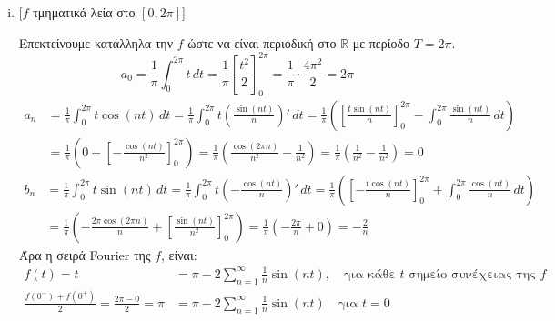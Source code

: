 \documentclass[a4paper,table]{report}
\begin{document}
\begin{solution}
\item {}
  \begin{enumerate}[i)]
    \item 
      \begin{minipage}[t]{0.53\textwidth}
        [$f$ τμηματικά λεία στο $ [0,2 \pi] $]
      \end{minipage}

      Επεκτείνουμε κατάλληλα την $f$ ώστε να είναι περιοδική στο $\mathbb{R}$ 
      με περίοδο $ T=2 \pi $.
      \[
        a_{0} = \frac{1}{\pi} \int _{0}^{2 \pi} t\,{dt} = \frac{1}{\pi}
        \left[\frac{t^{2}}{2}\right]_{0}^{2 \pi} = \frac{1}{\pi} \cdot 
        \frac{4 \pi ^{2}}{2} = 2 \pi
      \] 
      \begin{align*}
        a_{n} &= \frac{1}{\pi} \int _{0}^{2 \pi} t \cos{(nt)} \,{dt} = \frac{1}{\pi} 
        \int _{0}^{2 \pi} t \left(\frac{\sin{(nt)}}{n}\right)' \,{dt} = \frac{1}{\pi}
        \left(\left[\frac{t \sin{(nt)}}{n} \right]_{0}^{2 \pi} - \int _{0}^{2 \pi}
        \frac{\sin{(nt)}}{n} \,{dt}\right) \\ 
              &= \frac{1}{\pi} \left(0 - \left[- \frac{\cos{(nt)}}{n^{2}}\right]_{0}^{2 
                \pi}\right) = \frac{1}{\pi} \left(\frac{\cos{(2 \pi n)}}{n^{2}} - 
                  \frac{1}{n^{2}}\right) = \frac{1}{\pi} \left(\frac{1}{n^{2}} - 
                \frac{1}{n^{2}}\right) = 0
      \end{align*} 
      \begin{align*}
        b_{n} &= \frac{1}{\pi} \int _{0}^{2 \pi} t \sin{(nt)} \,{dt} = \frac{1}{\pi} 
        \int _{0}^{2 \pi } t \left(- \frac{\cos{(nt)}}{n}\right)' \,{dt} = \frac{1}{\pi}
        \left(\left[- \frac{t \cos{(nt)}}{n} \right]_{0}^{2 \pi} + \int _{0}^{2 \pi}
        \frac{\cos{(nt)}}{n} \,{dt}\right) \\
              &= \frac{1}{\pi} \left(- \frac{2 \pi \cos{(2 \pi n)}}{n} + \left[
              \frac{\sin{(nt)}}{n^{2}}\right]_{0}^{2 \pi}\right) = 
              \frac{1}{\pi} \left(- \frac{2 \pi}{n} + 0\right) = - \frac{2}{n} 
      \end{align*}
      Άρα η σειρά \textlatin{Fourier} της $f$, είναι:
      \begin{align*}
        f(t) = t &= \pi - 2\sum_{n=1}^{\infty} \frac{1}{n} \sin{(nt)} , 
        \quad \text{για κάθε $t$ σημείο συνέχειας της $f$} \\
        \frac{f(0^{-})+f(0^{+})}{2} = \frac{2 \pi - 0 }{2} = \pi 
                 &= \pi - 2\sum_{n=1}^{\infty} \frac{1}{n} \sin{(nt)} 
                 \quad \text{για $t=0$} 
      \end{align*}


\end{enumerate}
\end{solution}
\end{document}
